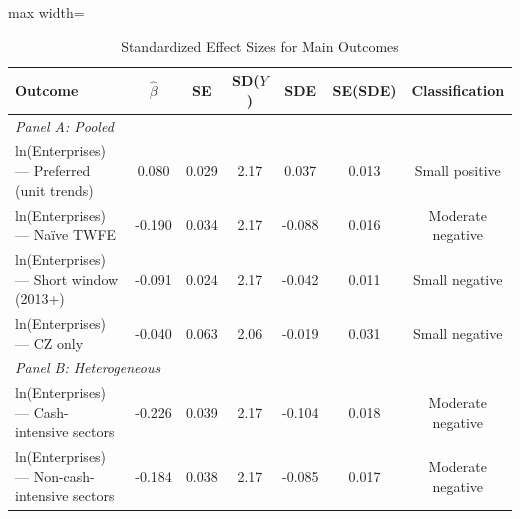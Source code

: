 \begin{table}[H]
\centering
\caption{Standardized Effect Sizes for Main Outcomes}
\label{tab:sde}
\begin{threeparttable}
\begin{adjustbox}{max width=\textwidth}
\begin{tabular}{lcccccc}
\toprule
Outcome & $\hat{\beta}$ & SE & SD($Y$) & SDE & SE(SDE) & Classification \\
\midrule
\multicolumn{7}{l}{\textit{Panel A: Pooled}} \\
ln(Enterprises) --- Preferred (unit trends) & 0.080 & 0.029 & 2.17 & 0.037 & 0.013 & Small positive \\
ln(Enterprises) --- Na\"ive TWFE & -0.190 & 0.034 & 2.17 & -0.088 & 0.016 & Moderate negative \\
ln(Enterprises) --- Short window (2013+) & -0.091 & 0.024 & 2.17 & -0.042 & 0.011 & Small negative \\
ln(Enterprises) --- CZ only & -0.040 & 0.063 & 2.06 & -0.019 & 0.031 & Small negative \\
\midrule
\multicolumn{7}{l}{\textit{Panel B: Heterogeneous}} \\
ln(Enterprises) --- Cash-intensive sectors & -0.226 & 0.039 & 2.17 & -0.104 & 0.018 & Moderate negative \\
ln(Enterprises) --- Non-cash-intensive sectors & -0.184 & 0.038 & 2.17 & -0.085 & 0.017 & Moderate negative \\
\bottomrule
\end{tabular}
\end{adjustbox}
\par\vspace{0.3em}
{\footnotesize
\begin{itemize}[leftmargin=*]

\end{itemize}}
\end{threeparttable}
\end{table}
